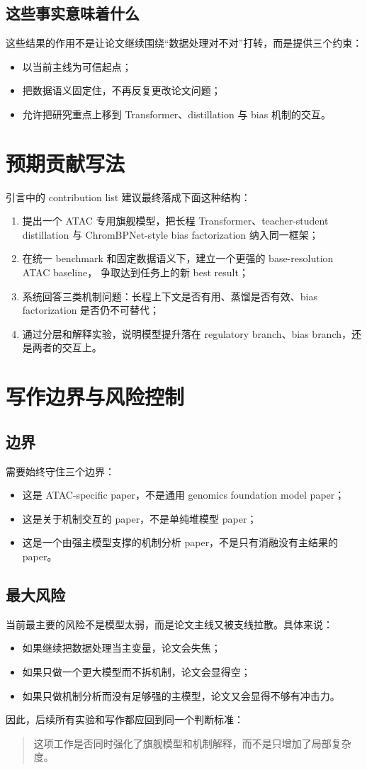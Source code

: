 \documentclass[11pt,a4paper]{ctexart}
\begin{document}
\subsection{这些事实意味着什么}
这些结果的作用不是让论文继续围绕“数据处理对不对”打转，而是提供三个约束：
\begin{itemize}[leftmargin=2em]
  \item 以当前主线为可信起点；
  \item 把数据语义固定住，不再反复更改论文问题；
  \item 允许把研究重点上移到 Transformer、distillation 与 bias 机制的交互。
\end{itemize}

\section{预期贡献写法}

引言中的 contribution list 建议最终落成下面这种结构：
\begin{enumerate}[leftmargin=2em]
  \item 提出一个 ATAC 专用旗舰模型，把长程 Transformer、teacher-student distillation
  与 ChromBPNet-style bias factorization 纳入同一框架；
  \item 在统一 benchmark 和固定数据语义下，建立一个更强的 base-resolution ATAC baseline，
  争取达到任务上的新 best result；
  \item 系统回答三类机制问题：长程上下文是否有用、蒸馏是否有效、bias factorization
  是否仍不可替代；
  \item 通过分层和解释实验，说明模型提升落在 regulatory branch、bias branch，还是两者的交互上。
\end{enumerate}

\section{写作边界与风险控制}

\subsection{边界}
需要始终守住三个边界：
\begin{itemize}[leftmargin=2em]
  \item 这是 ATAC-specific paper，不是通用 genomics foundation model paper；
  \item 这是关于机制交互的 paper，不是单纯堆模型 paper；
  \item 这是一个由强主模型支撑的机制分析 paper，不是只有消融没有主结果的 paper。
\end{itemize}

\subsection{最大风险}
当前最主要的风险不是模型太弱，而是论文主线又被支线拉散。具体来说：
\begin{itemize}[leftmargin=2em]
  \item 如果继续把数据处理当主变量，论文会失焦；
  \item 如果只做一个更大模型而不拆机制，论文会显得空；
  \item 如果只做机制分析而没有足够强的主模型，论文又会显得不够有冲击力。
\end{itemize}

因此，后续所有实验和写作都应回到同一个判断标准：
\begin{quote}
这项工作是否同时强化了旗舰模型和机制解释，而不是只增加了局部复杂度。
\end{quote}
\end{document}
